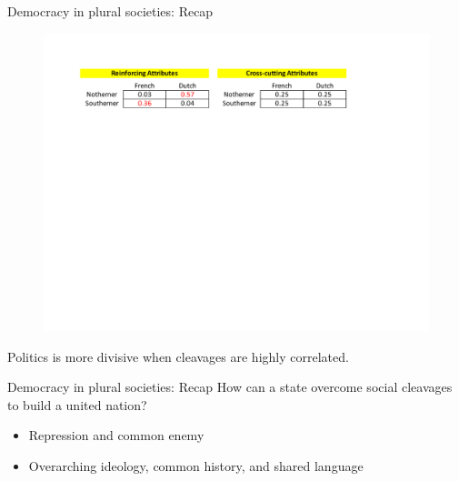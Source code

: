 \documentclass[10pt]{beamer}
\begin{document}
\begin{frame}{Democracy in plural societies: Recap}
	\begin{figure}
	\centering
	\includegraphics[scale=0.55]{Figs/structure}
	\end{figure}
	\pause
	Politics is more divisive when cleavages are highly correlated.
\end{frame}

\begin{frame}{Democracy in plural societies: Recap}
	How can a state overcome social cleavages to build a united nation?
	\vspace{0.2cm}
	\begin{itemize}
	\item Repression and common enemy
	\item Overarching ideology, common history, and shared language
	\end{itemize}
\end{frame}
\end{document}
